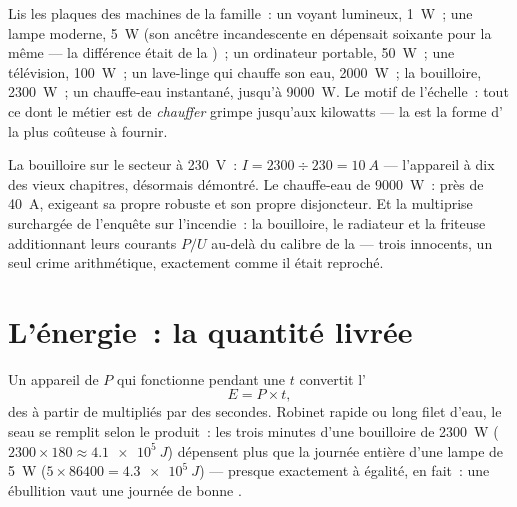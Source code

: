 \begin{example}\label{ex:g9:electric-power-energy:ladder}
Lis les plaques des machines de la famille~: un voyant lumineux,
\qty{1}{W}~; une lampe moderne, \qty{5}{W} (son ancêtre incandescente
en dépensait soixante pour la même  --- la différence était de
la )~; un ordinateur portable, \qty{50}{W}~; une télévision,
\qty{100}{W}~; un lave-linge qui chauffe son eau, \qty{2000}{W}~; la
bouilloire, \qty{2300}{W}~; un chauffe-eau instantané, jusqu'à
\qty{9000}{W}. Le motif de l'échelle~: tout ce dont le métier est de
\emph{chauffer} grimpe jusqu'aux kilowatts --- la  est la forme
d' la plus coûteuse à fournir.
\end{example}

\begin{example}\label{ex:g9:electric-power-energy:fuses}
La bouilloire sur le secteur à \qty{230}{V}~:
$I = 2300 \div 230 = \qty{10}{A}$ --- l'appareil à dix  des
vieux chapitres, désormais démontré. Le chauffe-eau de \qty{9000}{W}~:
près de \qty{40}{A}, exigeant sa propre  robuste et son propre
disjoncteur. Et la multiprise surchargée de l'enquête sur l'incendie~:
la bouilloire, le radiateur et la friteuse additionnant leurs courants
$P/U$ au-delà du calibre de la  --- trois innocents, un seul
crime arithmétique, exactement comme il était reproché.
\end{example}

\section{L'énergie~: la quantité livrée}

\begin{proposition}\label{prop:g9:electric-power-energy:Pt}
Un appareil de  $P$ qui fonctionne pendant une  $t$
convertit l'
\[
E = P \times t ,
\]
des  à partir de  multipliés par des secondes. Robinet
rapide ou long filet d'eau, le seau se remplit selon le produit~: les
trois minutes d'une bouilloire de \qty{2300}{W}
($2300 \times 180 \approx \qty{4.1e5}{J}$) dépensent plus que la
journée entière d'une lampe de \qty{5}{W}
($5 \times 86400 = \qty{4.3e5}{J}$) --- presque exactement à égalité,
en fait~: une ébullition vaut une journée de bonne .
\end{proposition}

